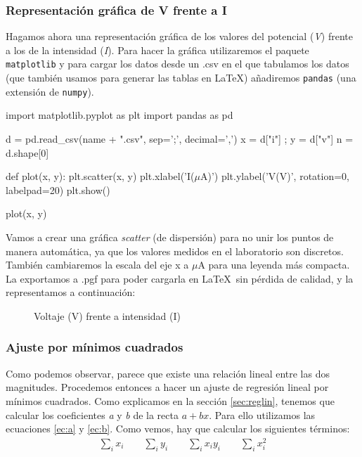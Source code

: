 \documentclass[12pt, a4paper, titlepage]{article}
\newcommand{\code}[1]{\texttt{#1}} %
\begin{document}
  \subsubsection{Representación gráfica de V frente a I}

  Hagamos ahora una representación gráfica de los valores del potencial (\textit{V}) frente a los de la intensidad (\textit{I}). Para hacer la gráfica utilizaremos el paquete \code{matplotlib} y para cargar los datos desde un .csv en el que tabulamos los datos (que también usamos para generar las tablas en \LaTeX) añadiremos \code{pandas} (una extensión de \code{numpy}).

  \begin{python}
    import matplotlib.pyplot as plt
    import pandas as pd

    d = pd.read_csv(name + ".csv", sep=';', decimal=',')
    x = d["i"] ; y = d["v"]
    n = d.shape[0]

    def plot(x, y):
        plt.scatter(x, y)
        plt.xlabel('I($\mu$A)')
        plt.ylabel('V(V)', rotation=0, labelpad=20)
        plt.show()

    plot(x, y)
  \end{python}

  Vamos a crear una gráfica \textit{scatter} (de dispersión) para no unir los puntos de manera automática, ya que los valores medidos en el laboratorio son discretos. También cambiaremos la escala del eje x a $\mu$A para una leyenda más compacta. La exportamos a .pgf para poder cargarla en \LaTeX\  sin pérdida de calidad, y la representamos a continuación:

  \begin{figure}[H]
    \hspace{2.5em} 
    \caption{Voltaje (V) frente a intensidad (I)}
  \end{figure}

  \subsubsection{Ajuste por mínimos cuadrados}
  \label{sec:ajusteminres}

  Como podemos observar, parece que existe una relación lineal entre las dos magnitudes. Procedemos entonces a hacer un ajuste de regresión lineal por mínimos cuadrados. Como explicamos en la sección \ref{sec:reglin}, tenemos que calcular los coeficientes \textit{a} y \textit{b} de la recta $a + bx$. Para ello utilizamos las ecuaciones \ref{ec:a} y \ref{ec:b}. Como vemos, hay que calcular los siguientes términos:
  \begin{gather}
    \sum_i x_i \nonumber \qquad \sum_i y_i \nonumber \qquad \sum_i x_iy_i \nonumber \qquad \sum_i x_i^2 \nonumber
  \end{gather}
\end{document}
